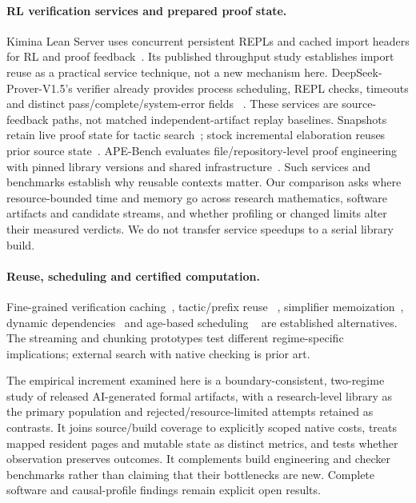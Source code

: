 \documentclass[10pt,twocolumn]{article}
\begin{document}
\paragraph{RL verification services and prepared proof state.}
Kimina Lean Server uses concurrent persistent REPLs and cached import headers
for RL and proof feedback~\cite{kimina,kiminaPaper}.
Its published throughput study establishes import reuse as a practical
service technique, not a new mechanism here.
DeepSeek-Prover-V1.5's verifier already provides process scheduling, REPL
checks, timeouts and distinct pass/complete/system-error fields
~\cite{deepseekVerifierArtifact}. These services are source-feedback paths,
not matched independent-artifact replay baselines.
Snapshots retain live proof state for tactic search~\cite{leanSnapshot};
stock incremental elaboration reuses prior source state~\cite{leanIncremental}.
APE-Bench evaluates file/repository-level proof engineering with pinned
library versions and shared infrastructure~\cite{apeBench2026}.
Such services and benchmarks establish why reusable contexts matter.
Our comparison asks where resource-bounded time and memory go across
research mathematics, software artifacts and candidate streams, and whether
profiling or changed limits alter their measured verdicts.
We do not transfer service speedups to a serial library build.

\paragraph{Reuse, scheduling and certified computation.}
Fine-grained verification caching~\cite{boogieCache}, tactic/prefix reuse
~\cite{tactician2020,shred}, simplifier memoization~\cite{leanSimpCache},
dynamic dependencies~\cite{salsaDependencies,adapton} and age-based scheduling
~\cite{lubyRestart1993,soap2018} are established alternatives.
The streaming and chunking prototypes test different regime-specific
implications; external search with native checking is prior art.

The empirical increment examined here is a boundary-consistent, two-regime study of released
AI-generated formal artifacts, with a research-level library as the primary
population and rejected/resource-limited attempts retained as contrasts.
It joins source/build coverage to explicitly scoped native costs, treats
mapped resident pages and mutable state as distinct metrics, and tests
whether observation preserves outcomes.
It complements build engineering and checker benchmarks rather than claiming
that their bottlenecks are new. Complete software and causal-profile
findings remain explicit open results.
\end{document}
